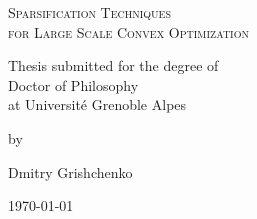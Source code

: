 \begin{titlepage}
\doublespacing

\vspace*{\fill}

	\centering

	{\scshape\Huge Sparsification Techniques \\ for Large Scale Convex Optimization \par}

	\vspace{3cm}
	
	{\LARGE Thesis submitted for the degree of \\ Doctor of Philosophy\\ at Universit\'e Grenoble Alpes \par}

	
	\vfill 
	
	{\LARGE by\par}

	\vfill
	
	{\LARGE Dmitry Grishchenko\par}

	\vfill

\vspace*{\fill}

	{\LARGE 	\today\par}
	
\end{titlepage}